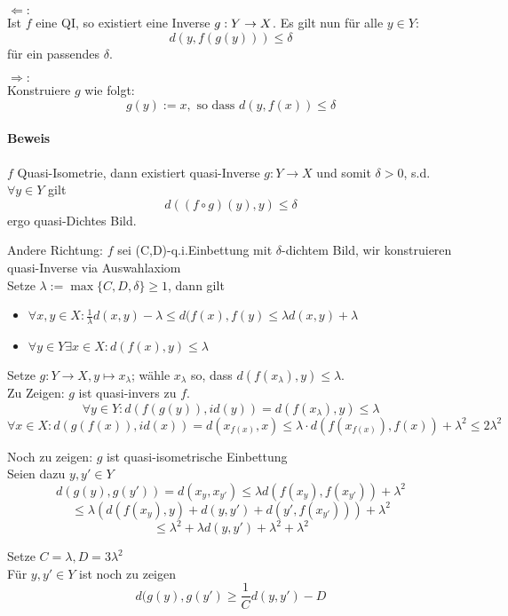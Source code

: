 \documentclass{article}
\begin{document}
\begin{Beweis}{}
$\Leftarrow:$\\
Ist $f$ eine QI, so existiert eine Inverse $g : Y \overset{}{\rightarrow} X$. Es gilt nun für alle $y \in Y:$
\[ d( y, f(g(y)) ) \leq \delta \]
für ein passendes $\delta$.


$\Rightarrow:$\\
Konstruiere $g$ wie folgt:
\[g(y) := x, \text{ so dass } d(y,f(x)) \leq \delta \]

\paragraph{Beweis}
$f$ Quasi-Isometrie, dann existiert quasi-Inverse $g : Y \rightarrow X$ und somit $\delta > 0$, s.d. $\forall y \in Y$ gilt
\[d((f\circ g)(y), y) \leq \delta \]
ergo quasi-Dichtes Bild.

Andere Richtung: $f$ sei (C,D)-q.i.Einbettung mit $\delta$-dichtem Bild, wir konstruieren quasi-Inverse via Auswahlaxiom\\
Setze $\lambda := \max\{C,D,\delta\} \geq 1$, dann gilt
\begin{itemize}
	\item $\forall x,y \in X:  \frac{1}{\lambda} d(x,y) - \lambda \leq d(f(x),f(y) \leq {\lambda} d(x,y) + \lambda  $
	\item $\forall y \in Y \exists x \in X: d(f(x),y) \leq \lambda$
\end{itemize}
Setze $g:Y\rightarrow X, y \longmapsto x_\lambda $; wähle $x_\lambda$ so, dass $d(f(x_\lambda), y) \leq \lambda$.\\

Zu Zeigen: $g$ ist quasi-invers zu $f$.\\
\[\forall y\in Y: d(f(g(y)), id(y)) = d(f(x_\lambda), y) \leq \lambda \]
\[\forall x\in X: d(g(f(x)), id(x)) = d(x_{f(x)}, x) \leq \lambda \cdot d(f(x_{f(x)}), f(x)) + \lambda^2 \leq 2\lambda^2 \]

Noch zu zeigen: $g$ ist quasi-isometrische Einbettung\\

Seien dazu $y,y' \in Y$
\[d(g(y),g(y')) = d(x_y, x_{y'}) \leq \lambda d(f(x_y), f(x_{y'})) + \lambda^2 \]
\[\leq \lambda \left( d(f(x_y),y) + d(y, y') + d(y', f(x_{y'})) \right) + \lambda^2\]
\[\leq \lambda^2 + \lambda d(y, y') + \lambda^2 + \lambda^2 \]

Setze $C = \lambda, D = 3\lambda^2$\\

Für $y,y' \in Y$ ist noch zu zeigen
\[d(g(y),g(y') \geq \frac{1}{C} d(y,y') - D \]

\end{Beweis}
\end{document}
